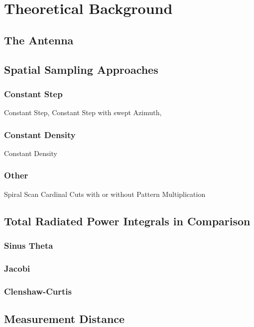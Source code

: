 \chapter{Theoretical Background}

\section{The Antenna}


\section{Spatial Sampling Approaches}

\subsection{Constant Step}
Constant Step, Constant Step with swept Azimuth,

\subsection{Constant Density}

Constant Density

\subsection{Other}

Spiral Scan
Cardinal Cuts with or without Pattern Multiplication

\section{Total Radiated Power Integrals in Comparison}

\subsection{Sinus Theta}

\subsection{Jacobi}

\subsection{Clenshaw-Curtis}

\section{Measurement Distance}